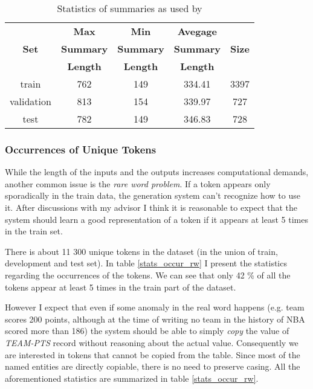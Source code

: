 \begin{table}[h!]
    \centering
    \begin{tabular}{ccccc}
        \toprule
        {}    & \textbf{Max} & \textbf{Min} & \textbf{Avegage}& {} \\
        \textbf{Set} & \textbf{Summary} & \textbf{Summary} & \textbf{Summary} & \textbf{Size} \\
        {} & \textbf{Length} & \textbf{Length} & \textbf{Length} & {} \\
        \midrule
        train      & 762 & 149 & 334.41 & 3397  \\
        validation & 813 & 154 & 339.97 & 727 \\
        test       & 782 & 149 & 346.83 & 728
    \end{tabular}
    \caption{Statistics of summaries as used by \citep{wiseman2017}} \label{stats_sums_orig_rw}
\end{table}


\subsubsection{Occurrences of Unique Tokens}

While the length of the inputs and the outputs increases computational demands, another common issue is the \emph{rare word problem}. If a token appears only sporadically in the train data, the generation system can't recognize how to use it. After discussions with my advisor I think it is reasonable to expect that the system should learn a good representation of a token if it appears at least 5 times in the train set.

There is about 11 300 unique tokens in the dataset (in the union of train, development and test set). In table \ref{stats_occur_rw} I present the statistics regarding the occurrences of the tokens. We can see that only 42 \% of all the tokens appear at least 5 times in the train part of the dataset.

However I expect that even if some anomaly in the real word happens (e.g. team scores 200 points, although at the time of writing no team in the history of NBA scored more than 186) the system should be able to simply \emph{copy} the value of \emph{TEAM-PTS} record without reasoning about the actual value. Consequently we are interested in tokens that cannot be copied from the table. Since most of the named entities are directly copiable, there is no need to preserve casing. All the aforementioned statistics are summarized in table \ref{stats_occur_rw}.

